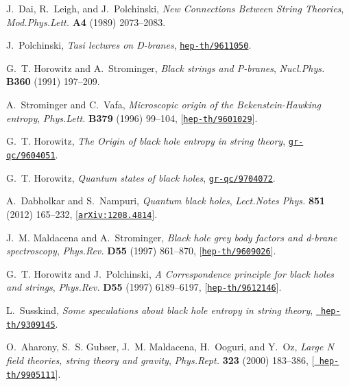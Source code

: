 \documentclass[12pt,a4paper]{article}
\begin{document}
\begin{thebibliography}{100}
J.~Dai, R.~Leigh, and J.~Polchinski, {\it {New Connections Between String
  Theories}},  {\em Mod.Phys.Lett.} {\bf A4} (1989) 2073--2083.

J.~Polchinski, {\it {Tasi lectures on D-branes}},
  \href{http://xxx.lanl.gov/abs/hep-th/9611050}{{\tt hep-th/9611050}}.

G.~T. Horowitz and A.~Strominger, {\it {Black strings and P-branes}},  {\em
  Nucl.Phys.} {\bf B360} (1991) 197--209.

A.~Strominger and C.~Vafa, {\it {Microscopic origin of the Bekenstein-Hawking
  entropy}},  {\em Phys.Lett.} {\bf B379} (1996) 99--104,
  [\href{http://xxx.lanl.gov/abs/hep-th/9601029}{{\tt hep-th/9601029}}].

G.~T. Horowitz, {\it {The Origin of black hole entropy in string theory}},
  \href{http://xxx.lanl.gov/abs/gr-qc/9604051}{{\tt gr-qc/9604051}}.

G.~T. Horowitz, {\it {Quantum states of black holes}},
  \href{http://xxx.lanl.gov/abs/gr-qc/9704072}{{\tt gr-qc/9704072}}.

A.~Dabholkar and S.~Nampuri, {\it {Quantum black holes}},  {\em Lect.Notes
  Phys.} {\bf 851} (2012) 165--232,
  [\href{http://xxx.lanl.gov/abs/1208.4814}{{\tt arXiv:1208.4814}}].

J.~M. Maldacena and A.~Strominger, {\it {Black hole grey body factors and
  d-brane spectroscopy}},  {\em Phys.Rev.} {\bf D55} (1997) 861--870,
  [\href{http://xxx.lanl.gov/abs/hep-th/9609026}{{\tt hep-th/9609026}}].

G.~T. Horowitz and J.~Polchinski, {\it {A Correspondence principle for black
  holes and strings}},  {\em Phys.Rev.} {\bf D55} (1997) 6189--6197,
  [\href{http://xxx.lanl.gov/abs/hep-th/9612146}{{\tt hep-th/9612146}}].

L.~Susskind, {\it {Some speculations about black hole entropy in string
  theory}},  \href{http://xxx.lanl.gov/abs/hep-th/9309145}{{\tt
  hep-th/9309145}}.

O.~Aharony, S.~S. Gubser, J.~M. Maldacena, H.~Ooguri, and Y.~Oz, {\it {Large N
  field theories, string theory and gravity}},  {\em Phys.Rept.} {\bf 323}
  (2000) 183--386, [\href{http://xxx.lanl.gov/abs/hep-th/9905111}{{\tt
  hep-th/9905111}}].


\end{thebibliography}
\end{document}

